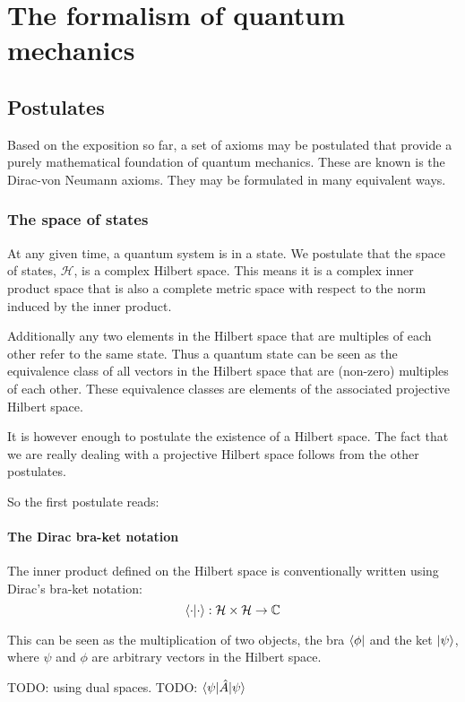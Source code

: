\chapter{The formalism of quantum mechanics}
\section{Postulates}
Based on the exposition so far, a set of axioms may be postulated that provide a purely mathematical foundation of quantum mechanics. These are known is the Dirac-von Neumann axioms. They may be formulated in many equivalent ways.

\subsection{The space of states}
At any given time, a quantum system is in a state. We postulate that the space of states, $\mathcal{H}$, is a complex Hilbert space. This means it is a complex inner product space that is also a complete metric space with respect to the norm induced by the inner product.

Additionally any two elements in the Hilbert space that are multiples of each other refer to the same state. Thus a quantum state can be seen as the equivalence class of all vectors in the Hilbert space that are (non-zero) multiples of each other. These equivalence classes are elements of the associated projective Hilbert space.

It is however enough to postulate the existence of a Hilbert space. The fact that we are really dealing with a projective Hilbert space follows from the other postulates.

So the first postulate reads:

\subsubsection{The Dirac bra-ket notation}
The inner product defined on the Hilbert space is conventionally written using Dirac's bra-ket notation:
\[ \braket{\cdot}{\cdot}: \mathcal{H} \times \mathcal{H} \to \C \]

This can be seen as the multiplication of two objects, the bra $\left\langle \phi \right|$ and the ket $\left| \psi \right\rangle$, where $\psi$ and $\phi$ are arbitrary vectors in the Hilbert space.

TODO: using dual spaces.
TODO: $\braket[\hat{A}]{\psi}{\psi}$

